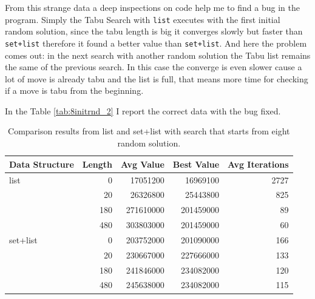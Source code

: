 	From this strange data a deep inspections on code help me to find a bug in the program. Simply the Tabu Search with \verb|list| executes with the first initial random solution, since the tabu length is big it converges slowly but faster than \verb|set+list| therefore it found a better value than \verb|set+list|. And here the problem comes out: in the next search with another random solution the Tabu list remains the same of the previous search. In this case the converge is even slower cause a lot of move is already tabu and the list is full, that means more time for checking if a move is tabu from the beginning.
	
	In the Table \ref{tab:8initrnd_2} I report the correct data with the bug fixed.
	
	\begin{table}[]
		\centering
		\begin{tabular}{lrrrr}
			\toprule
			\textbf{Data Structure} & \textbf{Length} & \textbf{Avg Value} & \textbf{Best Value} & \textbf{Avg Iterations} \\
			\midrule
			list                    & 0               & 17051200           & 16969100            & 2727                    \\
			& 20              & 26326800           & 25443800            & 825                     \\
			& 180             & 271610000          & 201459000           & 89                      \\
			& 480             & 303803000          & 201459000           & 60                      \\
			\midrule
			set+list                & 0               & 203752000          & 201090000           & 166                     \\
			& 20              & 230667000          & 227666000           & 133                     \\
			& 180             & 241846000          & 234082000           & 120                     \\
			& 480             & 245638000          & 234082000           & 115   \\
			\bottomrule                 
		\end{tabular}
		\caption{Comparison results from list and set+list with search that starts from eight random solution.}
		\label{tab:8initrnd_1}
	\end{table}

